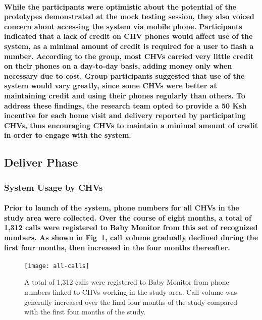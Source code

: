 \paragraph{While the participants were optimistic about the potential of the prototypes demonstrated at the mock testing session, they also voiced concern about accessing the system via mobile phone. Participants indicated that a lack of credit on CHV phones would affect use of the system, as a minimal amount of credit is required for a user to flash a number. According to the group, most CHVs carried very little credit on their phones on a day-to-day basis, adding money only when necessary due to cost. Group participants suggested that use of the system would vary greatly, since some CHVs were better at maintaining credit and using their phones regularly than others. To address these findings, the research team opted to provide a 50 Ksh incentive for each home visit and delivery reported by participating CHVs, thus encouraging CHVs to maintain a minimal amount of credit in order to engage with the system.}


\subsection{Deliver Phase}

\subsubsection{System Usage by CHVs}
\paragraph{Prior to launch of the system, phone numbers for all CHVs in the study area were collected. Over the course of eight months, a total of 1,312 calls were registered to Baby Monitor from this set of recognized numbers. As shown in Fig~\ref{fig:allCHVcalls}, call volume gradually declined during the first four months, then increased in the four months thereafter.}

\begin{figure}[h]
	\begin{center}
	\texttt{[image: all-calls]}
	\end{center}
	\caption[All CHV Calls]{A total of 1,312 calls were registered to Baby Monitor from phone numbers linked to CHVs working in the study area. Call volume was generally increased over the final four months of the study compared with the first four months of the study.}
	\label{fig:allCHVcalls}
\end{figure}

